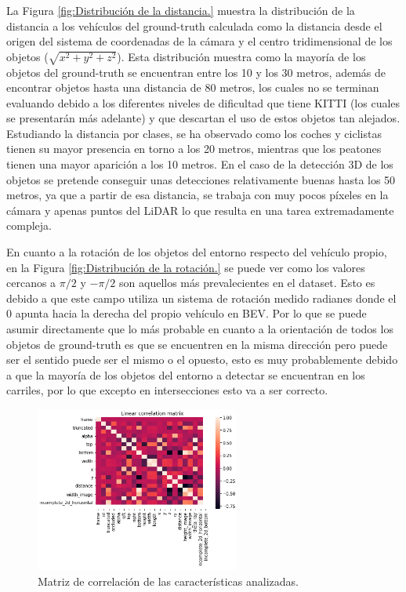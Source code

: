 La Figura \ref{fig:Distribución de la distancia.} muestra la distribución de la distancia a los vehículos del ground-truth calculada como la distancia desde el origen del sistema de coordenadas de la cámara y el centro tridimensional de los objetos ($\sqrt{x^2+y^2+z^2}$). Esta distribución muestra como la mayoría de los objetos del ground-truth se encuentran entre los 10 y los 30 metros, además de encontrar objetos hasta una distancia de 80 metros, los cuales no se terminan evaluando debido a los diferentes niveles de dificultad que tiene KITTI (los cuales se presentarán más adelante) y que descartan el uso de estos objetos tan alejados. Estudiando la distancia por clases, se ha observado como los coches y ciclistas tienen su mayor presencia en torno a los 20 metros, mientras que los peatones tienen una mayor aparición a los 10 metros. En el caso de la detección 3D de los objetos se pretende conseguir unas detecciones relativamente buenas hasta los 50 metros, ya que a partir de esa distancia, se trabaja con muy pocos píxeles en la cámara y apenas puntos del \ac{LiDAR} lo que resulta en una tarea extremadamente compleja.

En cuanto a la rotación de los objetos del entorno respecto del vehículo propio, en la Figura \ref{fig:Distribución de la rotación.} se puede ver como los valores cercanos a $\pi/2$ y $-\pi/2$ son aquellos más prevalecientes en el dataset. Esto es debido a que este campo utiliza un sistema de rotación medido radianes donde el 0 apunta hacia la derecha del propio vehículo en \ac{BEV}. Por lo que se puede asumir directamente que lo más probable en cuanto a la orientación de todos los objetos de ground-truth es que se encuentren en la misma dirección pero puede ser el sentido puede ser el mismo o el opuesto, esto es muy probablemente debido a que la mayoría de los objetos del entorno a detectar se encuentran en los carriles, por lo que excepto en intersecciones esto va a ser correcto.

\begin{figure}[H]
    \centering
    \includegraphics[width=0.6\textwidth]{Book/figures/6_approx_distancia/corr_matrix_kitti.png}
    \caption{Matriz de correlación de las características analizadas.}
    \label{fig:Matriz de correlación de las características analizadas.}
\end{figure}

